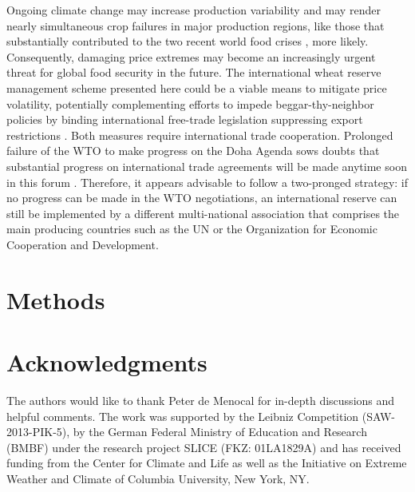 \documentclass[12pt]{article}
\begin{document}
Ongoing climate change may increase production variability \cite{WHE13} and may render nearly simultaneous crop failures in major production regions, like those that substantially contributed to the two recent world food crises \cite{ASS11,CHA14}, more likely. Consequently, damaging price extremes may become an increasingly urgent threat for global food security in the future. The international wheat reserve management scheme presented here could be a viable means to mitigate price volatility, potentially complementing efforts to impede beggar-thy-neighbor policies by binding international free-trade legislation suppressing export restrictions \cite{ANA13}. Both measures require international trade cooperation. Prolonged failure of the WTO to make progress on the Doha Agenda sows doubts that substantial progress on international trade agreements will be made anytime soon in this forum \cite{HLPE11}. Therefore, it appears advisable to follow a two-pronged strategy: if no progress can be made in the WTO negotiations, an international reserve can still be implemented by a different multi-national association that comprises the main producing countries such as the UN or the Organization for Economic Cooperation and Development.

\section*{Methods}%





\section*{Acknowledgments}
The authors would like to thank Peter de Menocal for in-depth discussions and
helpful comments. The work was supported by the Leibniz Competition
(SAW-2013-PIK-5), by the German Federal Ministry of Education and Research
(BMBF) under the research project SLICE (FKZ: 01LA1829A) and has received
funding from the Center for Climate and Life as well as the Initiative on
Extreme Weather and Climate of Columbia University, New York, NY.  
\end{document}
